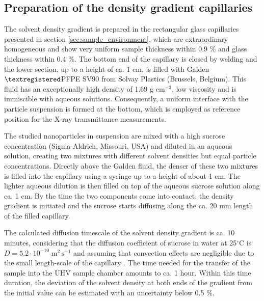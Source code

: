 \subsection{Preparation of the density gradient capillaries}
\label{sec:GradientPreparation}
The solvent density gradient is prepared in the rectangular glass capillaries presented in section \ref{sec:sample_environment}, which are extraordinary homogeneous and show very uniform sample thickness within 0.9 $\%$ and glass thickness within 0.4 $\%$. The bottom end of the capillary is closed by welding and the lower section, up to a height of ca. \(1\) cm, is filled with Galden\(\textregistered\)PFPE SV90 from Solvay Plastics (Brussels, Belgium). This fluid has an exceptionally high density of 1.69 g cm$^{-3}$, low viscosity and is immiscible with aqueous solutions. Consequently, a uniform interface with the particle suspension is formed at the bottom, which is employed as reference position for the X-ray transmittance measurements. 

The studied nanoparticles in suspension are mixed with a high sucrose concentration (Sigma-Aldrich, Missouri, USA) and diluted in an aqueous solution, creating two mixtures with different solvent densities but equal particle concentrations. Directly above the Galden fluid, the denser of these two mixtures is filled into the capillary using a syringe up to a height of about 1 cm. The lighter aqueous dilution is then filled on top of the aqueous sucrose solution along ca. 1 cm. By the time the two components come into contact, the density gradient is initiated and the sucrose starts diffusing along the ca. 20 mm length of the filled capillary.

The calculated diffusion timescale of the solvent density gradient is ca. 10 minutes, considering that the diffusion coefficient of sucrose in water at 25$^{\circ}$C is $D=5.2 \cdot 10^{-10} \;\mbox{m}^2\,\mbox{s}^{-1}$ \citep{uedaira_sugar-water_1985,ribeiro_binary_2006} and assuming that convection effects are negligible due to the small length-scale of the capillary \citep{berberan-santos_barometric_1997}. The time needed for the transfer of the sample into the UHV sample chamber amounts to ca. 1 hour. Within this time duration, the deviation of the solvent density at both ends of the gradient from the initial value can be estimated with an uncertainty below 0.5 $\%$. 


